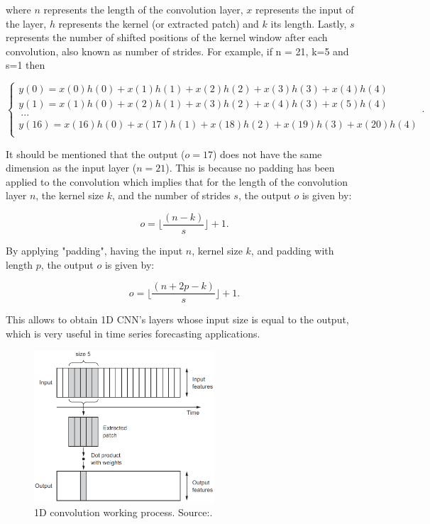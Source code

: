 where $n$ represents the length of the convolution layer, $x$ represents the input of the layer, $h$ represents the kernel (or extracted patch) and $k$ its length. Lastly, $s$ represents the number of shifted positions of the kernel window after each convolution, also known as number of strides. For example, if n = 21, k=5 and s=1 then

\begin{equation}
    \begin{cases} 
        y(0)=x(0)h(0)+x(1)h(1)+x(2)h(2)+x(3)h(3)+x(4)h(4)\\
        y(1)=x(1)h(0)+x(2)h(1)+x(3)h(2)+x(4)h(3)+x(5)h(4)\\
        \  ...\\
        y(16)=x(16)h(0)+x(17)h(1)+x(18)h(2)+x(19)h(3)+x(20)h(4)\\
    \end{cases} .
\end{equation}

It should be mentioned that the output ($o=17$) does not have the same dimension as the input layer ($n=21$). This is because no padding has been applied to the convolution which implies that for the length of the convolution layer $n$, the kernel size $k$, and the number of strides $s$, the output $o$ is given by:

\begin{equation}
    o = \lfloor \frac{(n-k)}{s} \rfloor + 1 .
\end{equation}

By applying "padding", having the input $n$, kernel size $k$, and padding with length $p$, the output $o$ is given by:

\begin{equation}
    o = \lfloor \frac{(n+2p-k)}{s} \rfloor + 1 .
\end{equation}

This allows to obtain \ac{1D CNN}'s layers whose input size is equal to the output, which is very useful in time series forecasting applications.

\begin{figure}[h!]
    \centering
    \begin{center}
    \includegraphics[width=0.6\textwidth]{Images/cnn.PNG}
    \caption{1D convolution working process. Source:\cite{cnn1}.}
    \label{cnn}
    \end{center}
\end{figure}

